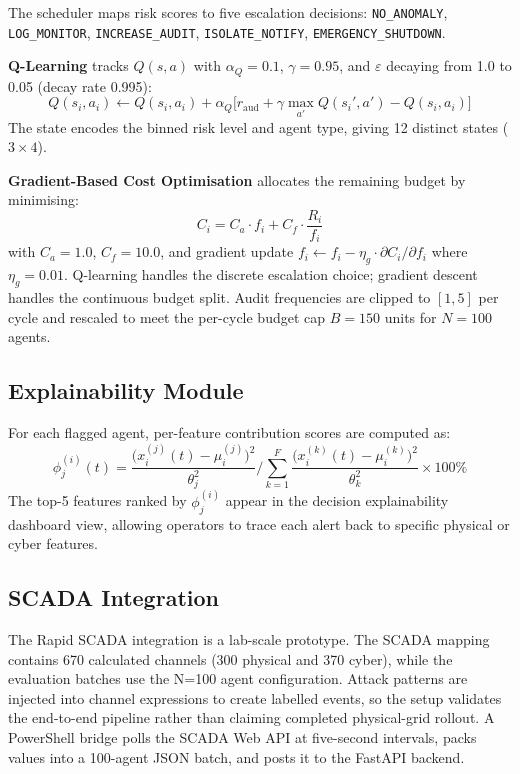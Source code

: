 \documentclass[conference,a4paper]{IEEEtran}
\begin{document}
The scheduler maps risk scores to five escalation decisions: \texttt{NO\_ANOMALY}, \texttt{LOG\_MONITOR}, \texttt{INCREASE\_AUDIT}, \texttt{ISOLATE\_NOTIFY}, \texttt{EMERGENCY\_SHUTDOWN}.

\textbf{Q-Learning} tracks $Q(s,a)$ with $\alpha_Q=0.1$, $\gamma=0.95$, and $\varepsilon$ decaying from 1.0 to 0.05 (decay rate 0.995):
\begin{equation}
Q(s_i, a_i) \leftarrow Q(s_i, a_i) + \alpha_Q\bigl[r_{\text{aud}} + \gamma \max_{a'} Q(s_i', a') - Q(s_i, a_i)\bigr]
\label{eq:qlearn}
\end{equation}
The state encodes the binned risk level and agent type, giving 12 distinct states ($3 \times 4$).

\textbf{Gradient-Based Cost Optimisation} allocates the remaining budget by minimising:
\begin{equation}
C_i = C_a \cdot f_i + C_f \cdot \frac{R_i}{f_i}
\label{eq:cost}
\end{equation}
with $C_a=1.0$, $C_f=10.0$, and gradient update $f_i \leftarrow f_i - \eta_g \cdot \partial C_i / \partial f_i$ where $\eta_g = 0.01$. Q-learning handles the discrete escalation choice; gradient descent handles the continuous budget split. Audit frequencies are clipped to $[1, 5]$ per cycle and rescaled to meet the per-cycle budget cap $B=150$ units for $N=100$ agents.

\subsection{Explainability Module}

For each flagged agent, per-feature contribution scores are computed as:
\begin{equation}
\phi_j^{(i)}(t) = \frac{\bigl(x_i^{(j)}(t) - \mu_i^{(j)}\bigr)^2}{\theta_j^2} \Bigg/ \sum_{k=1}^{F} \frac{\bigl(x_i^{(k)}(t) - \mu_i^{(k)}\bigr)^2}{\theta_k^2} \times 100\%
\label{eq:explain}
\end{equation}
The top-5 features ranked by $\phi_j^{(i)}$ appear in the decision explainability dashboard view, allowing operators to trace each alert back to specific physical or cyber features.

\subsection{SCADA Integration}

The Rapid SCADA integration is a lab-scale prototype. The SCADA mapping contains 670 calculated channels (300 physical and 370 cyber), while the evaluation batches use the N=100 agent configuration. Attack patterns are injected into channel expressions to create labelled events, so the setup validates the end-to-end pipeline rather than claiming completed physical-grid rollout. A PowerShell bridge polls the SCADA Web API at five-second intervals, packs values into a 100-agent JSON batch, and posts it to the FastAPI backend.
\end{document}
